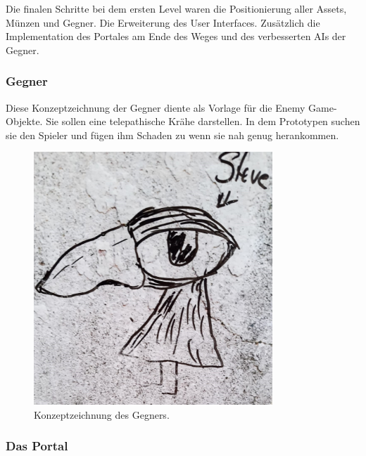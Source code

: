 Die finalen Schritte bei dem ersten Level waren die Positionierung aller Assets, Münzen und Gegner. Die Erweiterung des User Interfaces. Zusätzlich die Implementation des Portales am Ende des Weges und des verbesserten AIs der Gegner.

\subsubsection{Gegner}


\begin{minipage}[t]{0.5\textwidth}
Diese Konzeptzeichnung der Gegner diente als Vorlage für die Enemy Game-Objekte. 
Sie sollen eine telepathische Krähe darstellen. In dem Prototypen suchen sie den Spieler und fügen ihm Schaden zu wenn sie nah genug herankommen.

\end{minipage}
\hfill
\begin{minipage}[t]{0.5\textwidth}
  \begin{figure}[H]
    \centering
    \includegraphics[width=0.8\textwidth]{chapters/04/images/V3/steve.jpg}
    \caption{Konzeptzeichnung des Gegners.}
  \end{figure}
\end{minipage}

\subsubsection{Das Portal}

